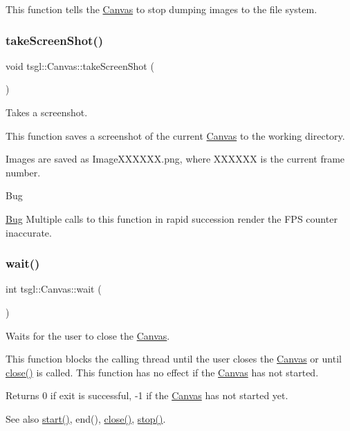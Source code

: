 This function tells the \hyperlink{classtsgl_1_1_canvas}{Canvas} to stop dumping images to the file system. \mbox{\label{classtsgl_1_1_canvas_ac035f43763b198f6915a0772973a5ea9}} 
\subsubsection{\texorpdfstring{take\+Screen\+Shot()}{takeScreenShot()}}
{\footnotesize\ttfamily void tsgl\+::\+Canvas\+::take\+Screen\+Shot (\begin{DoxyParamCaption}{ }\end{DoxyParamCaption})}



Takes a screenshot. 

This function saves a screenshot of the current \hyperlink{classtsgl_1_1_canvas}{Canvas} to the working directory.

Images are saved as Image\+X\+X\+X\+X\+X\+X.\+png, where X\+X\+X\+X\+XX is the current frame number. \begin{DoxyRefDesc}{Bug}
\item[\hyperlink{bug__bug000001}{Bug}]Multiple calls to this function in rapid succession render the F\+PS counter inaccurate. \end{DoxyRefDesc}
\mbox{\label{classtsgl_1_1_canvas_a39e69fd4d1ad8cf0e22ecea12f1ddf08}} 
\subsubsection{\texorpdfstring{wait()}{wait()}}
{\footnotesize\ttfamily int tsgl\+::\+Canvas\+::wait (\begin{DoxyParamCaption}{ }\end{DoxyParamCaption})}



Waits for the user to close the \hyperlink{classtsgl_1_1_canvas}{Canvas}. 

This function blocks the calling thread until the user closes the \hyperlink{classtsgl_1_1_canvas}{Canvas} or until \hyperlink{classtsgl_1_1_canvas_afaa1250b1da6b48b9c170a0655191938}{close()} is called. This function has no effect if the \hyperlink{classtsgl_1_1_canvas}{Canvas} has not started. \begin{DoxyReturn}{Returns}
0 if exit is successful, -\/1 if the \hyperlink{classtsgl_1_1_canvas}{Canvas} has not started yet. 
\end{DoxyReturn}
\begin{DoxySeeAlso}{See also}
\hyperlink{classtsgl_1_1_canvas_a654315f9b08a9b3b072eebf4b4d8ae89}{start()}, end(), \hyperlink{classtsgl_1_1_canvas_afaa1250b1da6b48b9c170a0655191938}{close()}, \hyperlink{classtsgl_1_1_canvas_a46cd37a9f2a146e57b4e0273faf6485c}{stop()}. 
\end{DoxySeeAlso}


